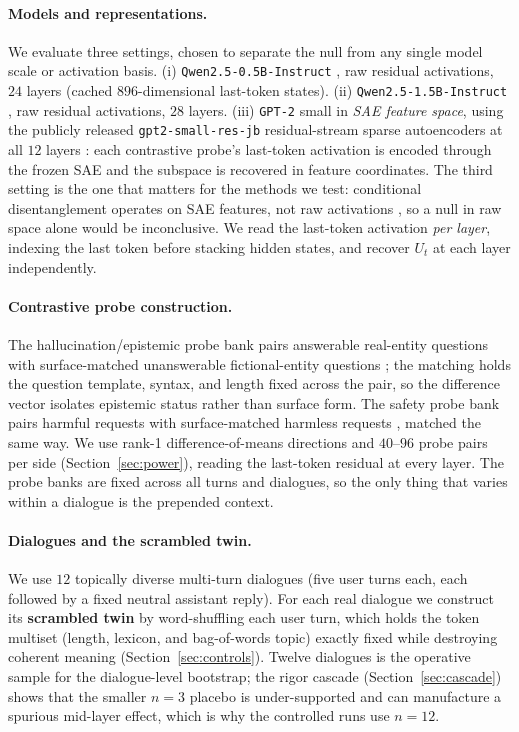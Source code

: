 \paragraph{Models and representations.} We evaluate three settings, chosen to separate the
null from any single model scale or activation basis. (i) \texttt{Qwen2.5-0.5B-Instruct}
\citep{qwen25}, raw residual activations, $24$ layers (cached $896$-dimensional last-token
states). (ii) \texttt{Qwen2.5-1.5B-Instruct} \citep{qwen25}, raw residual activations, $28$
layers. (iii) \texttt{GPT-2} small in \emph{SAE feature space}, using the publicly released
\texttt{gpt2-small-res-jb} residual-stream sparse autoencoders at all $12$ layers
\citep{cunningham2023sparse, bricken2023monosemanticity}: each contrastive probe's
last-token activation is encoded through the frozen SAE and the subspace is recovered in
feature coordinates. The third setting is the one that matters for the methods we test:
conditional disentanglement operates on SAE features, not raw activations
\citep{mahmoud2025unintended}, so a null in raw space alone would be inconclusive. We read
the last-token activation \emph{per layer}, indexing the last token before stacking hidden
states, and recover $U_t$ at each layer independently.

\paragraph{Contrastive probe construction.} The hallucination/epistemic probe bank pairs
answerable real-entity questions with surface-matched unanswerable fictional-entity
questions \citep{ferrando2025entity}; the matching holds the question template, syntax, and
length fixed across the pair, so the difference vector isolates epistemic status rather than
surface form. The safety probe bank pairs harmful requests with surface-matched harmless
requests \citep{arditi2024refusal}, matched the same way. We use rank-1 difference-of-means
directions and $40$--$96$ probe pairs per side (Section~\ref{sec:power}), reading the
last-token residual at every layer. The probe banks are fixed across all turns and
dialogues, so the only thing that varies within a dialogue is the prepended context.

\paragraph{Dialogues and the scrambled twin.} We use $12$ topically diverse multi-turn
dialogues (five user turns each, each followed by a fixed neutral assistant reply). For
each real dialogue we construct its \textbf{scrambled twin} by word-shuffling each user
turn, which holds the token multiset (length, lexicon, and bag-of-words topic) exactly fixed
while destroying coherent meaning (Section~\ref{sec:controls}). Twelve dialogues is the
operative sample for the dialogue-level bootstrap; the rigor cascade
(Section~\ref{sec:cascade}) shows that the smaller $n{=}3$ placebo is under-supported and can
manufacture a spurious mid-layer effect, which is why the controlled runs use $n{=}12$.

